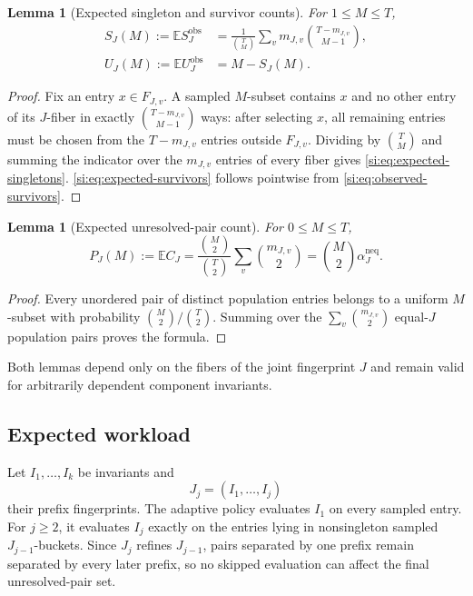 \documentclass[9pt,twoside]{pnas-new}
\newtheorem{lemma}[theorem]{Lemma}
\theoremstyle{definition}
\theoremstyle{remark}
\newcommand{\neqp}{\mathrm{neq}}
\begin{document}
\begin{lemma}[Expected singleton and survivor counts]
\label{si:lem:singleton-survivor}
For $1\le M\le T$,
\begin{align}
 S_J(M):=\mathbb E S_J^{\mathrm{obs}}
 &=\frac{1}{\binom TM}
   \sum_v m_{J,v}\binom{T-m_{J,v}}{M-1},
 \label{si:eq:expected-singletons}\\
 U_J(M):=\mathbb E U_J^{\mathrm{obs}}
 &=M-S_J(M).
 \label{si:eq:expected-survivors}
\end{align}
\end{lemma}

\begin{proof}
Fix an entry $x\in F_{J,v}$.  A sampled $M$-subset contains $x$ and no other entry of its $J$-fiber in exactly
$\binom{T-m_{J,v}}{M-1}$ ways: after selecting $x$, all remaining entries must be chosen from the $T-m_{J,v}$ entries outside $F_{J,v}$.  Dividing by $\binom TM$ and summing the indicator over the $m_{J,v}$ entries of every fiber gives \eqref{si:eq:expected-singletons}.  \eqref{si:eq:expected-survivors} follows pointwise from \eqref{si:eq:observed-survivors}.
\end{proof}

\begin{lemma}[Expected unresolved-pair count]
\label{si:lem:expected-pairs}
For $0\le M\le T$,
\begin{equation}
 P_J(M):=\mathbb E C_J
 =\frac{\binom M2}{\binom T2}\sum_v\binom{m_{J,v}}2
 =\binom M2\alpha_J^{\neqp}.
 \label{si:eq:expected-pairs}
\end{equation}
\end{lemma}

\begin{proof}
Every unordered pair of distinct population entries belongs to a uniform $M$-subset with probability $\binom M2/\binom T2$.  Summing over the $\sum_v\binom{m_{J,v}}2$ equal-$J$ population pairs proves the formula.
\end{proof}

Both lemmas depend only on the fibers of the joint fingerprint $J$ and remain valid for arbitrarily dependent component invariants.

\subsection{Expected workload}
Let $I_1,\ldots,I_k$ be invariants and
\[
 J_j=(I_1,\ldots,I_j)
\]
their prefix fingerprints.  The adaptive policy evaluates $I_1$ on every sampled entry.  For $j\ge2$, it evaluates $I_j$ exactly on the entries lying in nonsingleton sampled $J_{j-1}$-buckets.  Since $J_j$ refines $J_{j-1}$, pairs separated by one prefix remain separated by every later prefix, so no skipped evaluation can affect the final unresolved-pair set.
\end{document}
